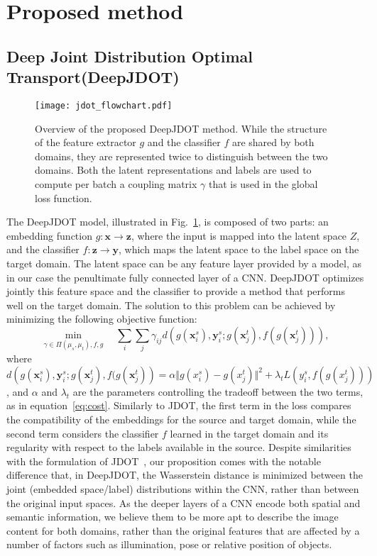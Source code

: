 \documentclass[runningheads]{llncs}
\begin{document}
\section{Proposed method}

\subsection{Deep Joint Distribution Optimal Transport(DeepJDOT)}

\begin{figure}[!t]
\centerline{
  \texttt{[image: jdot\_flowchart.pdf]}
}
  \caption{Overview of the proposed DeepJDOT method. While the structure of the feature extractor $g$ and the classifier $f$ are shared by both domains, they are represented twice to distinguish between the two domains. Both the latent representations and labels are used to compute per batch a coupling matrix $\gamma$ that is used in the global loss function.}
  \label{fig:flow}
\end{figure}

The DeepJDOT model, illustrated in Fig.~\ref{fig:flow}, is composed of two parts: an embedding function $g:\mathbf{x} \rightarrow \mathbf{z}$, where the input is mapped into the latent space $Z$, and the classifier $f: \mathbf{z} \rightarrow \mathbf{y}$, which maps the latent space to the label space on the target domain. The latent space can be any feature layer provided by a model, as in our case the penultimate fully connected layer of a CNN.
DeepJDOT optimizes jointly this feature space and the classifier to provide a method that performs well on the target domain. The solution to this problem can be achieved by minimizing the following objective function:
\begin{equation}
\min_{\gamma\in \Pi(\mu_s,\mu_t), f,g}\quad \sum_i\sum_j \gamma_{ij} d \left( g(\mathbf{x}_i^s), \mathbf{y}_i^s;g(\mathbf{x}_j^t), f(g(\mathbf{x}_j^t)) \right),
\label{eq:jdot} 
\end{equation}
where $d \left( g(\mathbf{x}_i^s), \mathbf{y}_i^s;g(\mathbf{x}_j^t), f(g(\mathbf{x}_j^t) \right) =\alpha \Vert g(x_i^s) - g(x_j^t) \Vert^2 + \lambda_t L\left(y_i^s,f(g(x_j^t))\right)$, and $\alpha$ and $\lambda_t$ are the parameters controlling the tradeoff between the two terms, as in equation~\eqref{eq:cost}. Similarly to JDOT, the first term in the loss compares the compatibility of the embeddings for the source and target domain, while the second term considers the classifier $f$ learned in the target domain and its regularity with respect to the labels available in the source. Despite similarities with the formulation of JDOT~\cite{courty2017joint}, our proposition comes with the notable difference that, in DeepJDOT, the Wasserstein distance is minimized between the joint (embedded space/label) distributions within the CNN, rather than between the original input spaces. As the deeper layers of a CNN encode both spatial and semantic information, we believe them to be more apt to describe the image content for both domains, rather than the original features that are affected by a number of factors such as illumination, pose or relative position of objects.
\end{document}
